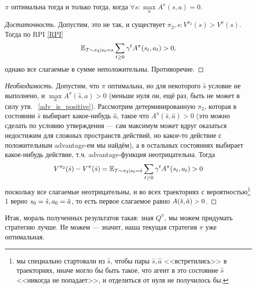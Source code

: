 \begin{theorem}
$\pi$ оптимальна тогда и только тогда, когда $\forall s \colon \max\limits_a A^\pi(s, a) = 0$.
\begin{proof}[Достаточность]
Допустим, это не так, и существует $\pi_2, s \colon V^{\pi_2}(s) > V^{\pi}(s)$. Тогда по RPI \eqref{RPI}
$$\mathbb{E}_{\mathcal{T} \sim \pi_2 \mid s_0 = s} \sum_{t \ge 0} \gamma^t A^{\pi}(s_t, a_t) > 0,$$
однако все слагаемые в сумме неположительны. Противоречие.
\end{proof}
\begin{proof}[Необходимость]
Допустим, что $\pi$ оптимальна, но для некоторого $\hat{s}$ условие не выполнено, и $\max\limits_{a} A^\pi(\hat{s}, a) > 0$ (меньше нуля он, ещё раз, быть не может в силу утв.~ \ref{adv_is_positive}). Рассмотрим детерминированную $\pi_2$, которая в состоянии $\hat{s}$ выбирает какое-нибудь $\hat{a}$, такое что $A^\pi(\hat{s}, \hat{a}) > 0$ (это можно сделать по условию утверждения --- сам максимум может вдруг оказаться недостижим для сложных пространств действий, но какое-то действие с положительным advantage-ем мы найдём), а в остальных состояниях выбирает какое-нибудь действие, т.ч. advantage-функция неотрицательна. Тогда  
$$V^{\pi_2}(\hat{s}) - V^{\pi}(\hat{s}) = \mathbb{E}_{\mathcal{T} \sim \pi_2 | s_0 = \hat{s}} \sum_{t \ge 0} \gamma^t A^{\pi}(s_t, a_t) > 0$$
поскольку все слагаемые неотрицательны, и во всех траекториях с вероятностью\footnote{мы специально стартовали из $\hat{s}$, чтобы пары $\hat{s}, \hat{a}$ <<встретились>> в траекториях, иначе могло бы быть такое, что агент в это состояние $\hat{s}$ <<никогда не попадает>>, и отделиться от нуля не получилось бы.} 1 верно $s_0 \HM= \hat{s}, a_0 \HM= \hat{a}$, то есть первое слагаемое равно $A(\hat{s}, \hat{a}) \HM> 0$. 
\end{proof} 
\end{theorem}

Итак, мораль полученных результатов такая: зная $Q^{\pi}$, мы можем придумать стратегию лучше. Не можем --- значит, наша текущая стратегия $\pi$ уже оптимальная.




